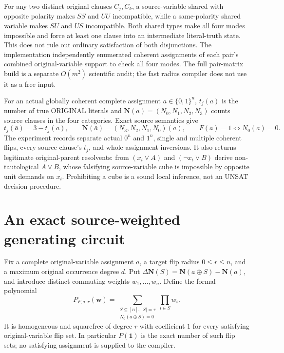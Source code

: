 \documentclass[11pt]{article}
\newcommand{\NN}{\mathbf N}
\begin{document}
For any two distinct original clauses $C_j,C_k$, a source-variable shared with opposite polarity makes $SS$ and $UU$ incompatible, while a same-polarity shared variable makes $SU$ and $US$ incompatible. Both shared types make all four modes impossible and force at least one clause into an intermediate literal-truth state. This does not rule out ordinary satisfaction of both disjunctions. The implementation independently enumerated coherent assignments of each pair's combined original-variable support to check all four modes. The full pair-matrix build is a separate $O(m^2)$ scientific audit; the fast radius compiler does not use it as a free input.

For an actual globally coherent complete assignment $a\in\{0,1\}^n$, $t_j(a)$ is the number of true ORIGINAL literals and $\NN(a)=(N_0,N_1,N_2,N_3)$ counts source clauses in the four categories. Exact source semantics give
\[
 t_j(\bar a)=3-t_j(a),\qquad \NN(\bar a)=(N_3,N_2,N_1,N_0)(a),\qquad F(a)=1\iff N_0(a)=0.
\]
The experiment records separate actual $0^n$ and $1^n$, single and multiple coherent flips, every source clause's $t_j$, and whole-assignment inversions. It also returns legitimate original-parent resolvents: from $(x_i\vee A)$ and $(\neg x_i\vee B)$ derive non-tautological $A\vee B$, whose falsifying source-variable cube is impossible by opposite unit demands on $x_i$. Prohibiting a cube is a sound local inference, not an UNSAT decision procedure.

\section{An exact source-weighted generating circuit}
Fix a complete original-variable assignment $a$, a target flip radius $0\le r\le n$, and a maximum original occurrence degree $d$. Put $\Delta\NN(S)=\NN(a\oplus S)-\NN(a)$, and introduce distinct commuting weights $w_1,\ldots,w_n$. Define the formal polynomial
\begin{equation}\label{eq:target}
 P_{F,a,r}(\boldsymbol w)=\sum_{\substack{S\subseteq[n],\ |S|=r\\N_0(a\oplus S)=0}}\prod_{i\in S}w_i.
\end{equation}
It is homogeneous and squarefree of degree $r$ with coefficient $1$ for every satisfying original-variable flip set. In particular $P(\boldsymbol1)$ is the exact number of such flip sets; no satisfying assignment is supplied to the compiler.
\end{document}
